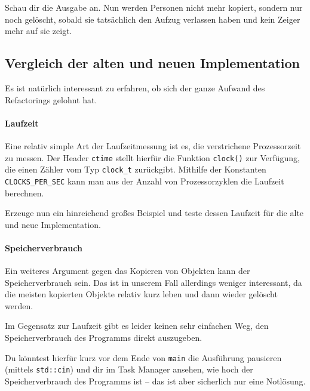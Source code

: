Schau dir die Ausgabe an.
Nun werden Personen nicht mehr kopiert, sondern nur noch gelöscht, sobald sie tatsächlich den Aufzug verlassen haben und kein Zeiger mehr auf sie zeigt.

\subsection{Vergleich der alten und neuen Implementation \optional}
\optionaltextbox

Es ist natürlich interessant zu erfahren, ob sich der ganze Aufwand des Refactorings gelohnt hat.

\paragraph{Laufzeit}
Eine relativ simple Art der Laufzeitmessung ist es, die verstrichene Prozessorzeit zu messen.
Der Header \lstinline{ctime} stellt hierfür die Funktion \lstinline{clock()} zur Verfügung, die einen Zähler vom Typ \lstinline{clock_t} zurückgibt.
Mithilfe der Konstanten \lstinline{CLOCKS_PER_SEC} kann man aus der Anzahl von Prozessorzyklen die Laufzeit berechnen.

Erzeuge nun ein hinreichend großes Beispiel und teste dessen Laufzeit für die alte und neue Implementation.



\paragraph{Speicherverbrauch}
Ein weiteres Argument gegen das Kopieren von Objekten kann der Speicherverbrauch sein.
Das ist in unserem Fall allerdings weniger interessant, da die meisten kopierten Objekte relativ kurz leben und dann wieder gelöscht werden.

Im Gegensatz zur Laufzeit gibt es leider keinen sehr einfachen Weg, den Speicherverbrauch des Programms direkt auszugeben.

Du könntest hierfür kurz vor dem Ende von \lstinline{main} die Ausführung pausieren (mittels \lstinline{std::cin}) und dir im Task Manager ansehen, wie hoch der Speicherverbrauch des Programms ist -- das ist aber sicherlich nur eine Notlösung.
